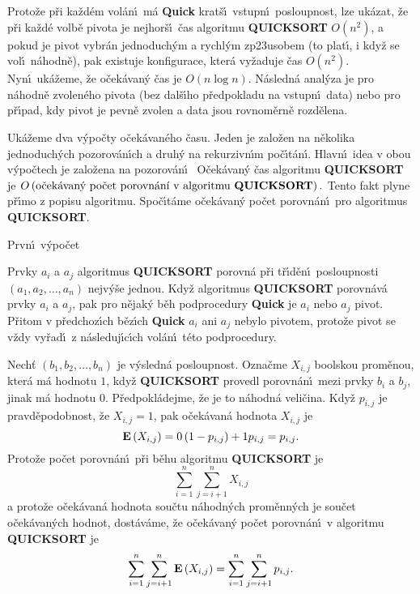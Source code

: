 \flushpar Proto\v ze p\v ri ka\v zd\'em vol\'an\'\i\ m\'a {\bf Quick} krat\v s\'\i\ 
vstupn\'\i\ posloupnost, lze uk\'azat, \v ze p\v ri ka\v zd\'e volb\v e 
pivota je nejhor\v s\'\i\ \v cas algoritmu {\bf QUICKSORT} $O\left(n^2
\right)$, a 
pokud je pivot vybr\'an jedno\-du\-ch\'ym a rychl\'ym 
zp\accent23usobem (to plat\'\i , i kdy\v z se vol\'\i\ n\'ahodn\v e), pak 
exi\-stuje konfigurace, kter\'a vy\v zaduje \v cas $O\left(n^2\right)$. Nyn\'\i\ 
uk\'a\-\v zeme, \v ze o\v cek\'avan\'y \v cas je $O\left(n\log n\right)$. N\'asledn\'a anal\'y\-za 
je pro n\'a\-hod\-n\v e zvolen\'eho pivota (bez dal\v s\'\i ho p\v redpokladu na 
vstupn\'\i\ data) nebo pro p\v r\'\i pad, kdy pivot je pevn\v e zvolen a data 
jsou rovno\-m\v ern\v e rozd\v e\-lena.
\medskip

\flushpar Uk\'a\v zeme dva v\'ypo\v cty o\v cek\'avan\'eho \v casu.  Jeden 
je zalo\v zen na n\v ekolika jednoduch\'ych pozorov\'an\'\i ch a druh\'y 
na rekurzivn\'\i m po\v c\'\i t\'an\'\i .  Hlavn\'\i\ idea v obou 
v\'ypo\v ctech je zalo\v zena na pozorov\'an\'\i\ 
\smallskip
\flushpar O\v cek\'avan\'y \v cas algoritmu {\bf QUICKSORT} je \newline 
$O\left(\text{\rm o\v cek\'avan\'y po\v cet porovn\'an\'\i\ v algoritmu {\bf QUICKSORT}}
\right).$
\smallskip
\flushpar Tento fakt plyne p\v r\'\i mo z popisu algoritmu.  Spo\v c\'\i t\'ame 
o\v cek\'a\-van\'y po\v cet porovn\'an\'\i\ pro algoritmus {\bf QUICKSORT}.  
\medskip

\subhead
Prvn\'\i\ v\'ypo\v cet
\endsubhead
\smallskip

\flushpar Prvky $a_i$ a $a_j$ algoritmus {\bf QUICKSORT} porovn\'a 
p\v ri t\v r\'\i d\v en\'\i\ posloupnosti $\left(a_1,a_2,\dots,a_n\right)$ nejv\'y\v se jednou.  
Kdy\v z algoritmus {\bf QUICKSORT} porovn\'av\'a prvky $a_i$ a $a_
j$, 
pak pro n\v ejak\'y b\v eh podprocedury {\bf Quick} je $a_i$ nebo $
a_j$ 
pivot.  P\v ritom v p\v redchoz\'\i ch b\v ez\'\i ch {\bf Quick} $
a_i$ ani $a_j$ 
nebylo pivotem, proto\v ze pivot se v\v zdy vy\v rad\'\i\ z n\'asleduj\'\i c\'\i ch 
vol\'an\'\i\ t\'eto podprocedury.
\medskip

\flushpar Nech\v t $\left(b_1,b_2,\dots,b_n\right)$ je v\'ysledn\'a posloupnost.  
Ozna\v cme $X_{i,j}$ boolskou prom\v enou, kter\'a m\'a hodnotu $
1$, 
kdy\v z {\bf QUICKSORT} provedl porovn\'an\'\i\ mezi prvky $b_i$ a $
b_j$, 
jinak m\'a hodnotu $0$.  P\v redpokl\'adejme, \v ze je to n\'ahodn\'a 
veli\v cina. Kdy\v z $p_{i,j}$ je prav\-d\v e\-podobnost, \v ze $
X_{i,j}=1$, 
pak o\v cek\'avan\'a hodnota $X_{i,j}$ je 
$$\bold E\left(X_{i,j}\right)=0\left(1-p_{i,j}\right)+1p_{i,j}=p_{i,j}.$$
Proto\v ze po\v cet porovn\'an\'\i\ p\v ri b\v ehu algoritmu {\bf QUICKSORT} je
$$\sum_{i=1}^n\sum_{j=i+1}^nX_{i,j}$$
a proto\v ze o\v cek\'avan\'a hodnota sou\v ctu n\'ahodn\'ych 
prom\v enn\'ych je sou\v cet o\v cek\'avan\'ych hodnot, dost\'av\'ame, \v ze 
o\v cek\'avan\'y po\v cet porovn\'an\'\i\ v algoritmu {\bf QUICKSORT} je
$$\sum_{i=1}^n\sum_{j=i+1}^n\bold E\left(X_{i,j}\right)=\sum_{i=1}^n\sum_{j=
i+1}^np_{i,j}.$$
\medskip

